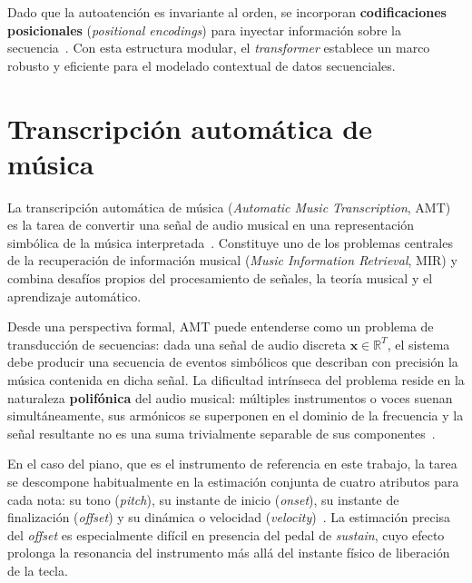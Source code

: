 \documentclass[11pt,spanish,listoffigures,listoftables]{tfgetsinf}
\begin{document}
Dado que la autoatención es invariante al orden, se incorporan \textbf{codificaciones posicionales}
(\textit{positional encodings}) para inyectar información sobre la secuencia~\cite{vaswani2017attention}. Con esta
estructura modular, el \textit{transformer} establece un marco robusto y eficiente para el modelado contextual de datos secuenciales.

\section{Transcripción automática de música}
\label{secpreliminaresamt}

La transcripción automática de música (\textit{Automatic Music Transcription},
AMT) es la tarea de convertir una señal de audio musical en una representación
simbólica de la música interpretada~\cite{benetos2019amt}. Constituye uno de
los problemas centrales de la recuperación de información musical
(\textit{Music Information Retrieval}, MIR) y combina desafíos propios del
procesamiento de señales, la teoría musical y el aprendizaje automático.

Desde una perspectiva formal, AMT puede entenderse como un problema de
transducción de secuencias: dada una señal de audio discreta
$\mathbf{x} \in \mathbb{R}^T$, el sistema debe producir una secuencia de
eventos simbólicos que describan con precisión la música contenida en dicha
señal. La dificultad intrínseca del problema reside en la naturaleza
\textbf{polifónica} del audio musical: múltiples instrumentos o voces suenan
simultáneamente, sus armónicos se superponen en el dominio de la frecuencia y
la señal resultante no es una suma trivialmente separable de sus
componentes~\cite{benetos2019amt}.

En el caso del piano, que es el instrumento de referencia en este trabajo, la
tarea se descompone habitualmente en la estimación conjunta de cuatro atributos
para cada nota: su tono (\textit{pitch}), su instante de inicio
(\textit{onset}), su instante de finalización (\textit{offset}) y su
dinámica o velocidad (\textit{velocity})~\cite{benetos2019amt}. La
estimación precisa del \textit{offset} es especialmente difícil en presencia del pedal
de \textit{sustain}, cuyo efecto prolonga la resonancia del instrumento más allá del
instante físico de liberación de la tecla.
\end{document}
